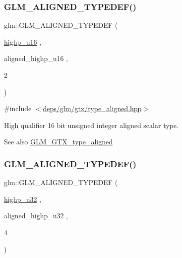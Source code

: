 \subsubsection{\texorpdfstring{G\+L\+M\+\_\+\+A\+L\+I\+G\+N\+E\+D\+\_\+\+T\+Y\+P\+E\+D\+E\+F()}{GLM\_ALIGNED\_TYPEDEF()}\hspace{0.1cm}{\footnotesize\ttfamily [102/209]}}
{\footnotesize\ttfamily glm\+::\+G\+L\+M\+\_\+\+A\+L\+I\+G\+N\+E\+D\+\_\+\+T\+Y\+P\+E\+D\+EF (\begin{DoxyParamCaption}\item[{\hyperlink{group__gtc__type__precision_ga9da2178d7501d9c0f225fa1a7b70cb45}{highp\+\_\+u16}}]{,  }\item[{aligned\+\_\+highp\+\_\+u16}]{,  }\item[{2}]{ }\end{DoxyParamCaption})}



{\ttfamily \#include $<$\hyperlink{gtx_2type__aligned_8hpp}{deps/glm/gtx/type\+\_\+aligned.\+hpp}$>$}

High qualifier 16 bit unsigned integer aligned scalar type. \begin{DoxySeeAlso}{See also}
\hyperlink{group__gtx__type__aligned}{G\+L\+M\+\_\+\+G\+T\+X\+\_\+type\+\_\+aligned} 
\end{DoxySeeAlso}
\mbox{\label{group__gtx__type__aligned_gaaadbb34952eca8e3d7fe122c3e167742}} 
\subsubsection{\texorpdfstring{G\+L\+M\+\_\+\+A\+L\+I\+G\+N\+E\+D\+\_\+\+T\+Y\+P\+E\+D\+E\+F()}{GLM\_ALIGNED\_TYPEDEF()}\hspace{0.1cm}{\footnotesize\ttfamily [103/209]}}
{\footnotesize\ttfamily glm\+::\+G\+L\+M\+\_\+\+A\+L\+I\+G\+N\+E\+D\+\_\+\+T\+Y\+P\+E\+D\+EF (\begin{DoxyParamCaption}\item[{\hyperlink{group__gtc__type__precision_gae8e8a2c712653891a03c171795286ac5}{highp\+\_\+u32}}]{,  }\item[{aligned\+\_\+highp\+\_\+u32}]{,  }\item[{4}]{ }\end{DoxyParamCaption})}



